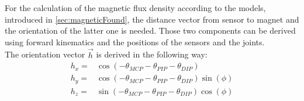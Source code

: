 For the calculation of the magnetic flux density according to the models, introduced in \ref{sec:magneticFound}, the distance vector from sensor to magnet and the orientation of the latter one is needed. Those two components can be derived using forward kinematics and the positions of the sensors and the joints.\\
The orientation vector $ \vec{h} $ is derived in the following way:
\begin{equation}\label{eq:orienH}
\begin{aligned}
h_{x} =& \cos(-\theta_{MCP}-\theta_{PIP}-\theta_{DIP})\\[3pt]
h_{y} =& \cos(-\theta_{MCP}-\theta_{PIP}-\theta_{DIP})\sin(\phi)\\[3pt]
h_{z} =& \sin(-\theta_{MCP}-\theta_{PIP}-\theta_{DIP})\cos(\phi)
\end{aligned}
\end{equation}

